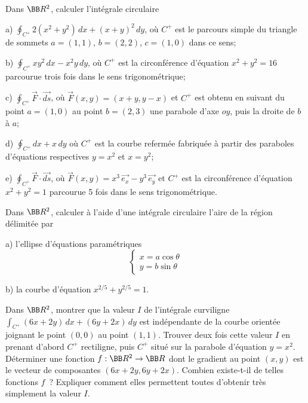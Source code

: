 \documentclass[12pt,french,oneside,a4paper]{memoir} %
\begin{document}
\begin{exo}
Dans $\BB R^2$, calculer l'intégrale circulaire 

a) $\displaystyle{\oint_{C^+}2(x^2+y^2)\,dx+(x+y)^2\,dy}$, \quad où
$C^+$ est le parcours simple du triangle de sommets $a=(1,1)$,
$b=(2,2)$, $c=(1,0)$ dans ce sens;

b) $\displaystyle{\oint_{C^+}xy^2\,dx-x^2y\,dy}$, \quad où
$C^+$ est la circonférence d'équation $x^2+y^2=16$ parcourue
trois fois dans le sens trigonométrique;

c) $\displaystyle{\oint_{C^+}\overrightarrow
F\cdot\overrightarrow{ds}}$, \quad où $\overrightarrow
F(x,y)=(x+y,y-x)$ et $C^+$ est obtenu en suivant du point $a=(1,0)$
au point $b=(2,3)$ une parabole d'axe $oy$, puis la droite de $b$
à $a$;

d)  $\displaystyle{\oint_{C^+}dx+x\,dy}$ \quad où $C^+$ est la
courbe refermée fabriquée à partir des paraboles
d'équations respectives $y=x^2$ et $x=y^2$;

e) $\displaystyle{\oint_{C^+}\overrightarrow
F\cdot\overrightarrow{ds}}$, \quad où $\overrightarrow
F(x,y)=x^3\,\overrightarrow{e_x}-y^3\,\overrightarrow{e_y}$ et
$C^+$ est la circonférence d'équation $x^2+y^2=1$ parcourue 5
fois dans le sens trigonométrique.
\end{exo}
\begin{exo}
Dans $\BB R^2$, calculer à l'aide d'une intégrale
circulaire l'aire de la région délimitée par

a) l'ellipse d'équations paramétriques
$$
\left\{
\begin{array}{c}
x=a\cos\theta\\
y=b\sin\theta
\end{array}
\right.
$$

b) la courbe d'équation $x^{2/5}+y^{2/5}=1$.
\end{exo}

\begin{exo}
Dans $\BB R^2$, montrer que la valeur $I$ de l'intégrale
curviligne\\
$\displaystyle{\int_{C^+}(6x+2y)\,dx+(6y+2x)\,dy}$ est
indépendante de la courbe orientée joignant le point $(0,0)$ au
point $(1,1)$. Trouver deux fois cette valeur $I$ en prenant
d'abord $C^+$ rectiligne, puis $C^+$ situé sur la parabole
d'équation $y=x^2$. Déterminer une fonction $f:\BB
R^2\rightarrow\BB R$ dont le gradient au point $(x,y)$ est le
vecteur de composantes $(6x+2y, 6y+2x)$. Combien existe-t-il de
telles fonctions $f$~? Expliquer comment elles permettent toutes
d'obtenir très simplement la valeur $I$.
\end{exo}
\end{document}
